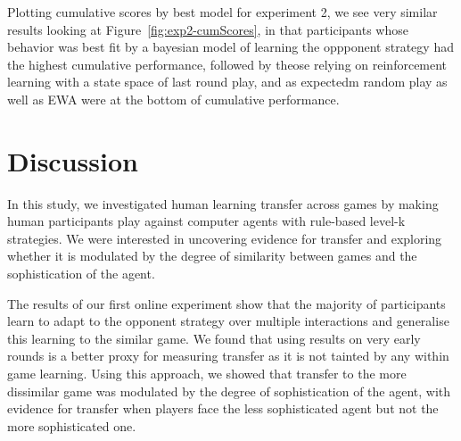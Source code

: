 \documentclass[man,floatsintext]{apa6}
\begin{document}
Plotting cumulative scores by best model for experiment 2, we see very similar results looking at Figure~\ref{fig:exp2-cumScores}, in that participants whose behavior was best fit by a bayesian model of learning the oppponent strategy had the highest cumulative performance, followed by theose relying on reinforcement learning with a state space of last round play, and as expectedm random play as well as EWA were at the bottom of cumulative performance.

\newpage

\hypertarget{discussion}{%
\section{Discussion}\label{discussion}}

In this study, we investigated human learning transfer across games by making human participants play against computer agents with rule-based level-k strategies. We were interested in uncovering evidence for transfer and exploring whether it is modulated by the degree of similarity between games and the sophistication of the agent.

The results of our first online experiment show that the majority of participants learn to adapt to the opponent strategy over multiple interactions and generalise this learning to the similar game. We found that using results on very early rounds is a better proxy for measuring transfer as it is not tainted by any within game learning. Using this approach, we showed that transfer to the more dissimilar game was modulated by the degree of sophistication of the agent, with evidence for transfer when players face the less sophisticated agent but not the more sophisticated one.
\end{document}
